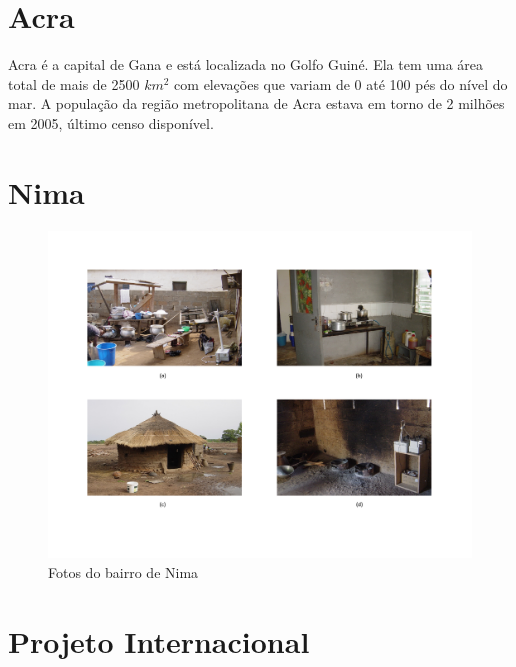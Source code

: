 \section{Acra}

Acra é a capital  de Gana e está localizada no Golfo Guiné. Ela tem uma área 
total de mais de 2500 $km^2$ com elevações que variam de 0 até 100 pés %
do nível 
do mar. 
A população da região metropolitana de Acra estava em torno de 2 milhões em 2005, 
último censo disponível.%


\section{Nima}

\begin{figure}[H]
  \caption{Fotos do bairro de Nima}
  \includegraphics[scale=0.35]{../inputs/images/zheng/nima.pdf}
\end{figure}

\section{Projeto Internacional}

